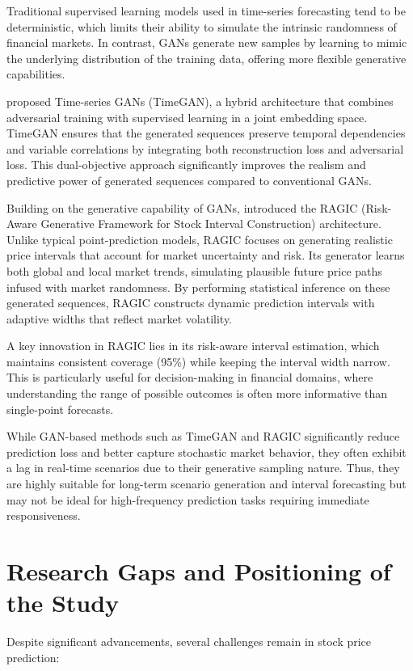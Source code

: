 Traditional supervised learning models used in time-series forecasting tend to be deterministic, which limits their ability to simulate the intrinsic randomness of financial markets. In contrast, GANs generate new samples by learning to mimic the underlying distribution of the training data, offering more flexible generative capabilities.

\textcite{yoon_time-series_nodate} proposed Time-series GANs (TimeGAN), a hybrid architecture that combines adversarial training with supervised learning in a joint embedding space. TimeGAN ensures that the generated sequences preserve temporal dependencies and variable correlations by integrating both reconstruction loss and adversarial loss. This dual-objective approach significantly improves the realism and predictive power of generated sequences compared to conventional GANs.

Building on the generative capability of GANs, \textcite{gu_ragic_2025} introduced the RAGIC (Risk-Aware Generative Framework for Stock Interval Construction) architecture. Unlike typical point-prediction models, RAGIC focuses on generating realistic price intervals that account for market uncertainty and risk. Its generator learns both global and local market trends, simulating plausible future price paths infused with market randomness. By performing statistical inference on these generated sequences, RAGIC constructs dynamic prediction intervals with adaptive widths that reflect market volatility.

A key innovation in RAGIC lies in its risk-aware interval estimation, which maintains consistent coverage (95\%) while keeping the interval width narrow. This is particularly useful for decision-making in financial domains, where understanding the range of possible outcomes is often more informative than single-point forecasts.

While GAN-based methods such as TimeGAN and RAGIC significantly reduce prediction loss and better capture stochastic market behavior, they often exhibit a lag in real-time scenarios due to their generative sampling nature. Thus, they are highly suitable for long-term scenario generation and interval forecasting but may not be ideal for high-frequency prediction tasks requiring immediate responsiveness.

\section{Research Gaps and Positioning of the Study}
Despite significant advancements, several challenges remain in stock price prediction:

